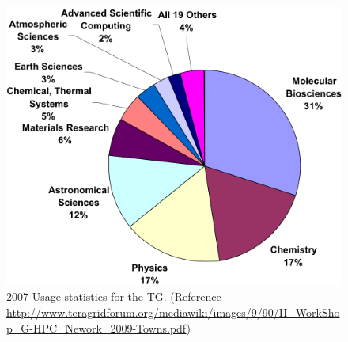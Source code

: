 \documentclass[]{svjour3}
\begin{document}


 


\begin{figure}
 \centering
\includegraphics[scale=0.40]{figures/teragrid-discipline07}
\caption{\small 2007 Usage statistics for the TG. (Reference
  \url{http://www.teragridforum.org/mediawiki/images/9/90/II_WorkShop_G-HPC_Nework_2009-Towns.pdf})}
  \label{tg2007}
\end{figure}





\end{document}
